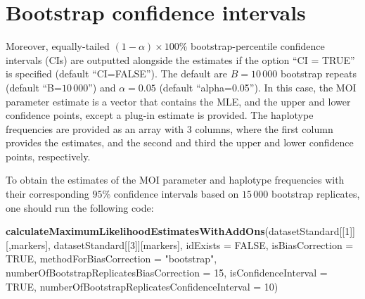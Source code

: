 \documentclass[
]{article}
\newenvironment{Shaded}{\begin{snugshade}}{\end{snugshade}}
\newcommand{\AttributeTok}[1]{\textcolor[rgb]{0.13,0.29,0.53}{#1}}
\newcommand{\ConstantTok}[1]{\textcolor[rgb]{0.56,0.35,0.01}{#1}}
\newcommand{\DecValTok}[1]{\textcolor[rgb]{0.00,0.00,0.81}{#1}}
\newcommand{\FunctionTok}[1]{\textcolor[rgb]{0.13,0.29,0.53}{\textbf{#1}}}
\newcommand{\NormalTok}[1]{#1}
\newcommand{\StringTok}[1]{\textcolor[rgb]{0.31,0.60,0.02}{#1}}
\begin{document}
\section*{Bootstrap confidence intervals}

Moreover, equally-tailed \((1-\alpha)\times 100\)\% bootstrap-percentile
confidence intervals (CIs) \cite{EfronTibshirani1994} are outputted
alongside the estimates if the option ``CI = TRUE'' is specified
(default ``CI=FALSE''). The default are \(B=10\,000\) bootstrap repeats
(default ``B=\(10\,000\)'') and \(\alpha=0.05\) (default
``alpha=0.05''). In this case, the MOI parameter estimate is a vector
that contains the MLE, and the upper and lower confidence points, except
a plug-in estimate is provided. The haplotype frequencies are provided
as an array with 3 columns, where the first column provides the
estimates, and the second and third the upper and lower confidence
points, respectively.

To obtain the estimates of the MOI parameter and haplotype frequencies
with their corresponding \(95\%\) confidence intervals based on
\(15\,000\) bootstrap replicates, one should run the following code:

\begin{Shaded}
\begin{Highlighting}[]
\FunctionTok{calculateMaximumLikelihoodEstimatesWithAddOns}\NormalTok{(datasetStandard[[}\DecValTok{1}\NormalTok{]][,markers], datasetStandard[[}\DecValTok{3}\NormalTok{]][markers], }\AttributeTok{idExists =} \ConstantTok{FALSE}\NormalTok{, }\AttributeTok{isBiasCorrection =} \ConstantTok{TRUE}\NormalTok{, }\AttributeTok{methodForBiasCorrection =} \StringTok{"bootstrap"}\NormalTok{, }\AttributeTok{numberOfBootstrapReplicatesBiasCorrection =} \DecValTok{15}\NormalTok{, }\AttributeTok{isConfidenceInterval =} \ConstantTok{TRUE}\NormalTok{, }\AttributeTok{numberOfBootstrapReplicatesConfidenceInterval =} \DecValTok{10}\NormalTok{)}
\end{Highlighting}
\end{Shaded}
\end{document}
